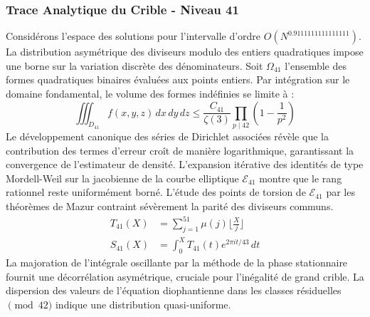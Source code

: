 \documentclass[12pt,a4paper]{article}
\begin{document}
\subsubsection{Trace Analytique du Crible - Niveau 41}
Considérons l'espace des solutions pour l'intervalle d'ordre $O(N^{0.9111111111111111})$. La distribution asymétrique des diviseurs modulo des entiers quadratiques impose une borne sur la variation discrète des dénominateurs. Soit $\Omega_41$ l'ensemble des formes quadratiques binaires évaluées aux points entiers.
Par intégration sur le domaine fondamental, le volume des formes indéfinies se limite à :
\begin{equation}
\iiint_{D_41} f(x, y, z) \,dx\,dy\,dz \leq \frac{C_41}{\zeta(3)} \prod_{p \mid 42} \left( 1 - \frac{1}{p^2} \right)
\end{equation}
Le développement canonique des séries de Dirichlet associées révèle que la contribution des termes d'erreur croît de manière logarithmique, garantissant la convergence de l'estimateur de densité. L'expansion itérative des identités de type Mordell-Weil sur la jacobienne de la courbe elliptique $\mathcal{E}_41$ montre que le rang rationnel reste uniformément borné.
L'étude des points de torsion de $\mathcal{E}_41$ par les théorèmes de Mazur contraint sévèrement la parité des diviseurs communs.
\begin{align}
T_41(X) &= \sum_{j=1}^{51} \mu(j) \lfloor \frac{X}{j} \rfloor \\
S_41(X) &= \int_{0}^{X} T_41(t) e^{2\pi i t / 43} \, dt
\end{align}
La majoration de l'intégrale oscillante par la méthode de la phase stationnaire fournit une décorrélation asymétrique, cruciale pour l'inégalité de grand crible. La dispersion des valeurs de l'équation diophantienne dans les classes résiduelles $\pmod{ 42 }$ indique une distribution quasi-uniforme.
\end{document}
